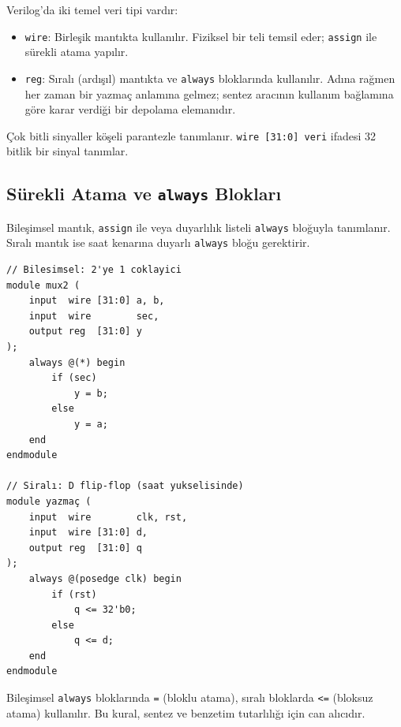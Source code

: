 Verilog'da iki temel veri tipi vardır:

\begin{itemize}[leftmargin=2em]
    \item \texttt{wire}: Birleşik mantıkta kullanılır. Fiziksel bir teli temsil eder; \texttt{assign} ile sürekli atama yapılır.
    \item \texttt{reg}: Sıralı (ardışıl) mantıkta ve \texttt{always} bloklarında kullanılır. Adına rağmen her zaman bir yazmaç anlamına gelmez; sentez aracının kullanım bağlamına göre karar verdiği bir depolama elemanıdır.
\end{itemize}

Çok bitli sinyaller köşeli parantezle tanımlanır. \texttt{wire [31:0] veri} ifadesi 32 bitlik bir sinyal tanımlar.

\subsection{Sürekli Atama ve \texttt{always} Blokları}
\label{sec:ekd-always}

Bileşimsel mantık, \texttt{assign} ile veya duyarlılık listeli \texttt{always} bloğuyla tanımlanır. Sıralı mantık ise saat kenarına duyarlı \texttt{always} bloğu gerektirir.

\begin{lstlisting}[style=verilog, caption={Bileşimsel ve sıralı mantık örnekleri}, label={lst:ekd-always}]
// Bilesimsel: 2'ye 1 coklayici
module mux2 (
    input  wire [31:0] a, b,
    input  wire        sec,
    output reg  [31:0] y
);
    always @(*) begin
        if (sec)
            y = b;
        else
            y = a;
    end
endmodule

// Siralı: D flip-flop (saat yukselisinde)
module yazmaç (
    input  wire        clk, rst,
    input  wire [31:0] d,
    output reg  [31:0] q
);
    always @(posedge clk) begin
        if (rst)
            q <= 32'b0;
        else
            q <= d;
    end
endmodule
\end{lstlisting}

\begin{bilginot}
Bileşimsel \texttt{always} bloklarında \texttt{=} (bloklu atama), sıralı bloklarda \texttt{<=} (bloksuz atama) kullanılır. Bu kural, sentez ve benzetim tutarlılığı için can alıcıdır.
\end{bilginot}

